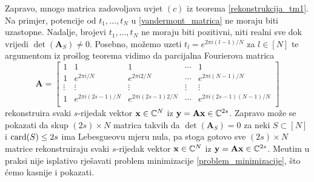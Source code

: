 \documentclass[a4paper,twoside,12pt]{memoir} %
\newcommand{\vect}[1]{\mathbf{#1}}
\renewcommand{\vec}{\vect}
\newcommand{\card}{\text{\normalfont{card}}}
\begin{document}
\indent Zapravo, mnogo matrica zadovoljava uvjet $(c)$ iz teorema \ref{rekonstrukcija_tm1}. Na primjer, potencije od $t_1,\dots,t_N$ u \eqref{vandermont_matrica} ne moraju biti uzastopne. Nadalje, brojevi $t_1,\dots,t_N$ ne moraju biti pozitivni, niti realni sve dok vrijedi $\det(\vec A_S) \neq 0$. Posebno, mo\v{z}emo uzeti $t_l = e^{2\pi i (l-1)/N}$ za $l \in [N]$ te argumentom iz pro\v{s}log teorema vidimo da parcijalna Fourierova matrica
\begin{equation*}
   \vec A = 
   \begin{bmatrix*}
       1 & 1 & 1 & \cdots & 1 \\
       1 & e^{2 \pi i/ N} & e^{2 \pi i2/ N} & \cdots & e^{2 \pi i(N-1)/ N} \\ 
       \vdots & \vdots & \vdots & \vdots & \vdots \\ 
       1 & e^{2 \pi i(2s-1)/ N} & e^{2 \pi i(2s-1)2/ N} & \cdots & e^{2 \pi i(2s-1)(N-1)/ N} \\ 
   \end{bmatrix*}
\end{equation*}
rekonstruira svaki $s$-rijedak vektor $\vec x \in \C^N$ iz $\vec y = \vec{Ax} \in \C^{2s}$.
Zapravo mo\v{z}e se pokazati da skup $(2s) \times N$ matrica takvih da $\det(\vec A_S) = 0$ za neki $S \subset [N]$ i $\card(S) \leq 2s$ ima Lebesgueovu mjeru nula, pa stoga gotovo sve $(2s) \times N$ matrice rekonstruiraju svaki $s$-rijedak vektor $\vec x \in \C^N$ iz $\vec y = \vec{Ax} \in \C^{2s}$. Me\dj utim u praksi nije isplativo rje\v{s}avati problem minimizacije \eqref{problem_minimizacije}, \v{s}to \'cemo kasnije i pokazati.
\end{document}
